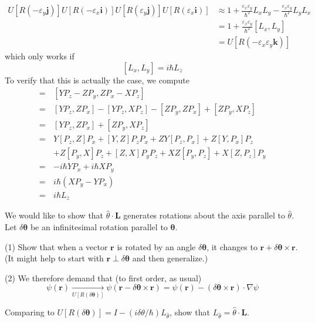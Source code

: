 \documentclass[../principles-of-quantum-mechanics.tex]{subfiles}
\begin{document}
\begin{questions}
\begin{solution}
		\begin{align*}
			U[R(-\varepsilon_y\mathbf{j})]U[R(-\varepsilon_x\mathbf{i})]U[R(\varepsilon_y\mathbf{j})] U[R(\varepsilon_x\mathbf{i})] &\approx 1 + \tfrac{\varepsilon_x\varepsilon_y}{\hbar^2}L_xL_y - \tfrac{\varepsilon_x\varepsilon_y}{\hbar^2}L_yL_x \\
			&= 1 + \tfrac{\varepsilon_x\varepsilon_y}{\hbar^2}[L_x, L_y] \\
			&= U[R(-\varepsilon_x\varepsilon_y\mathbf{k})]
		\end{align*}
		which only works if
		$$[L_x, L_y] = i\hbar L_z$$
		To verify that this is actually the case, we compute
		\begin{align*}
			[L_x, L_y] =\,&[YP_z - ZP_y, ZP_x - XP_z] \\
			=\,&[YP_z, ZP_x] - [YP_z, XP_z] - [ZP_y, ZP_x] + [ZP_y, XP_z] \\
			=\,&[YP_z, ZP_x] + [ZP_y, XP_z] \\ 
			=\,&Y[P_z, Z]P_x + [Y, Z]P_zP_x + ZY[P_z, P_x] + Z[Y, P_x]P_z \\
			&+ Z[P_y, X]P_z + [Z, X]P_yP_z + XZ[P_y, P_z] + X[Z, P_z]P_y \\
			=\,&{-i\hbar YP_x + i\hbar XP_y} \\
			=\,&i\hbar(XP_y - YP_x) \\
			=\,&i\hbar L_z
		\end{align*}
	\end{solution}

	\question We would like to show that $\hat{\theta}\cdot\mathbf{L}$ generates rotations about the axis parallel to $\hat{\theta}$. Let $\delta\boldsymbol{\theta}$ be an infinitesimal rotation parallel to $\boldsymbol{\theta}$.
	
	(1) Show that when a vector $\mathbf{r}$ is rotated by an angle $\delta\boldsymbol{\theta}$, it changes to $\mathbf{r}+ \delta\boldsymbol{\theta}\times\mathbf{r}$. (It might help to start with $\mathbf{r}\perp\delta\boldsymbol{\theta}$ and then generalize.)
	
	(2) We therefore demand that (to first order, as usual)
	$$\psi(\mathbf{r})\xrightarrow[{U[R(\delta\boldsymbol{\theta})]}]{} \psi(\mathbf{r} - \delta\boldsymbol{\theta}\times\mathbf{r}) = \psi(\mathbf{r}) - (\delta\boldsymbol{\theta}\times\mathbf{r})\cdot\nabla\psi$$
	
	Comparing to $U[R(\delta\boldsymbol{\theta})] = I - (i\delta\theta/\hbar)L_{\hat{\theta}}$, show that $L_{\hat{\theta}}=\hat{\theta}\cdot\mathbf{L}$.
	

\end{questions}
\end{document}
